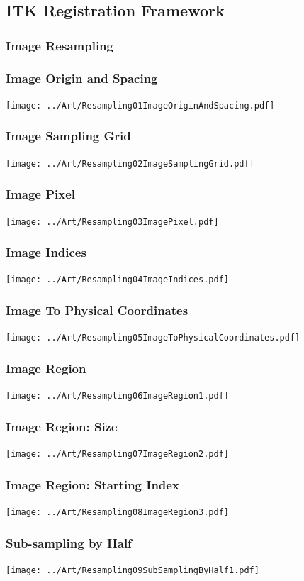 \subsection{ITK Registration Framework}

\subsubsection{Image Resampling}

\begin{frame}
  \frametitle{Image Origin and Spacing}
  \texttt{[image: ../Art/Resampling01ImageOriginAndSpacing.pdf]}
\end{frame}

\begin{frame}
  \frametitle{Image Sampling Grid}
  \texttt{[image: ../Art/Resampling02ImageSamplingGrid.pdf]}
\end{frame}

\begin{frame}
  \frametitle{Image Pixel}
  \texttt{[image: ../Art/Resampling03ImagePixel.pdf]}
\end{frame}

\begin{frame}
  \frametitle{Image Indices}
  \texttt{[image: ../Art/Resampling04ImageIndices.pdf]}
\end{frame}

\begin{frame}
  \frametitle{Image To Physical Coordinates}
  \texttt{[image: ../Art/Resampling05ImageToPhysicalCoordinates.pdf]}
\end{frame}

\begin{frame}
  \frametitle{Image Region}
  \texttt{[image: ../Art/Resampling06ImageRegion1.pdf]}
\end{frame}

\begin{frame}
  \frametitle{Image Region: Size}
  \texttt{[image: ../Art/Resampling07ImageRegion2.pdf]}
\end{frame}

\begin{frame}
  \frametitle{Image Region: Starting Index}
  \texttt{[image: ../Art/Resampling08ImageRegion3.pdf]}
\end{frame}

\begin{frame}
  \frametitle{Sub-sampling by Half}
  \texttt{[image: ../Art/Resampling09SubSamplingByHalf1.pdf]}
\end{frame}

